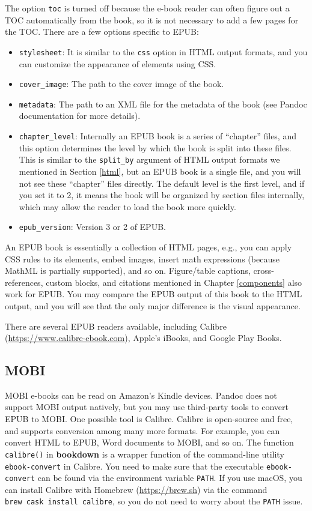\documentclass[
  12pt,
]{krantz}
\providecommand{\tightlist}{%
  \setlength{\itemsep}{0pt}\setlength{\parskip}{0pt}}
\theoremstyle{definition}
\theoremstyle{definition}
\theoremstyle{definition}
\theoremstyle{definition}
\theoremstyle{remark}
\begin{document}
The option \texttt{toc} is turned off because the e-book reader can often figure out a TOC automatically from the book, so it is not necessary to add a few pages for the TOC. There are a few options specific to EPUB:

\begin{itemize}
\tightlist
\item
  \texttt{stylesheet}: It is similar to the \texttt{css} option in HTML output formats, and you can customize the appearance of elements using CSS.
\item
  \texttt{cover\_image}: The path to the cover image of the book.
\item
  \texttt{metadata}: The path to an XML file for the metadata of the book (see Pandoc documentation for more details).
\item
  \texttt{chapter\_level}: Internally an EPUB book is a series of ``chapter'' files, and this option determines the level by which the book is split into these files. This is similar to the \texttt{split\_by} argument of HTML output formats we mentioned in Section \ref{html}, but an EPUB book is a single file, and you will not see these ``chapter'' files directly. The default level is the first level, and if you set it to 2, it means the book will be organized by section files internally, which may allow the reader to load the book more quickly.
\item
  \texttt{epub\_version}: Version 3 or 2 of EPUB.
\end{itemize}

An EPUB book is essentially a collection of HTML pages, e.g., you can apply CSS rules to its elements, embed images, insert math expressions (because MathML is partially supported), and so on. Figure/table captions, cross-references, custom blocks, and citations mentioned in Chapter \ref{components} also work for EPUB. You may compare the EPUB output of this book to the HTML output, and you will see that the only major difference is the visual appearance.

There are several EPUB readers available, including Calibre (\url{https://www.calibre-ebook.com}), Apple's iBooks, and Google Play Books.

\hypertarget{mobi}{%
\subsection{MOBI}\label{mobi}}

MOBI e-books can be read on Amazon's Kindle devices. Pandoc does not support MOBI output natively, but you may use third-party tools to convert EPUB to MOBI. One possible tool is Calibre. Calibre is open-source and free, and supports conversion among many more formats. For example, you can convert HTML to EPUB, Word documents to MOBI, and so on. The function \texttt{calibre()} in \textbf{bookdown} is a wrapper function of the command-line utility \texttt{ebook-convert} in Calibre. You need to make sure that the executable \texttt{ebook-convert} can be found via the environment variable \texttt{PATH}. If you use macOS, you can install Calibre with Homebrew (\url{https://brew.sh}) via the command \texttt{brew\ cask\ install\ calibre}, so you do not need to worry about the \texttt{PATH} issue.
\end{document}
